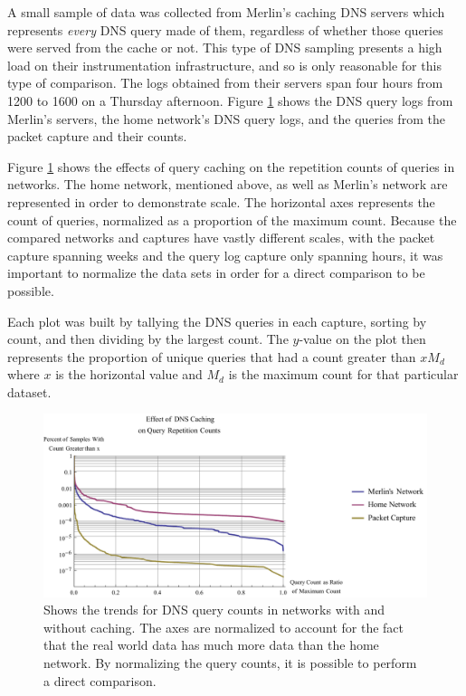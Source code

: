 \documentclass[12pt]{report}
\theoremstyle{remark}
\theoremstyle{definition}
\theoremstyle{definition}
\theoremstyle{definition}
\begin{document}
A small sample of data was collected from Merlin's caching DNS servers which
represents \emph{every} DNS query made of them, regardless of whether those
queries were served from the cache or not. This type of DNS sampling presents a
high load on their instrumentation infrastructure, and so is only reasonable for
this type of comparison. The logs obtained from their servers span four hours
from 1200 to 1600 on a Thursday afternoon. Figure \ref{caching} shows the DNS
query logs from Merlin's servers, the home network's DNS query logs, and the
queries from the packet capture and their counts.

Figure \ref{caching} shows the effects of query caching on the repetition counts
of queries in networks. The home network, mentioned above, as well as Merlin's
network are represented in order to demonstrate scale. The horizontal axes
represents the count of queries, normalized as a proportion of the maximum
count. Because the compared networks and captures have vastly different scales,
with the packet capture spanning weeks and the query log capture only spanning
hours, it was important to normalize the data sets in order for a direct
comparison to be possible.

Each plot was built by tallying the DNS queries in each capture, sorting by
count, and then dividing by the largest count. The $y$-value on the plot then
represents the proportion of unique queries that had a count greater than $xM_d$
where $x$ is the horizontal value and $M_d$ is the maximum count for that particular
dataset.

\begin{figure}[h]
\centering
\includegraphics[width=\textwidth]{figures/caching.pdf}
\caption[Effect of DNS Caching on Query Counts]{Shows the trends for DNS query
counts in networks with and without caching. The axes are normalized to account
for the fact that the real world data has much more data than the home network.
By normalizing the query counts, it is possible to perform a direct comparison.}
\label{caching}
\end{figure}
\end{document}
